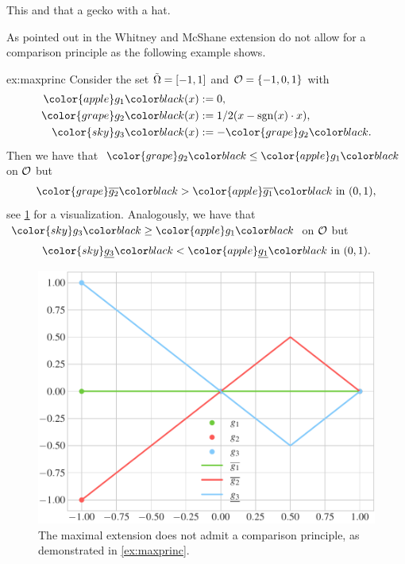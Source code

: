 \begin{example}{}{}
This and that a gecko with a hat.
\end{example}
%
As pointed out in \cite{aronsson2004tour} the Whitney and McShane extension do not allow for a comparison principle as the following example 
shows.
%
\begin{example}{}{ex:maxprinc}
Consider the set $\tilde{\Omega} = [-1,1]$ and $\mathcal{O}=\{-1,0,1\}$ with 
%
\begin{align*}
\color{apple}g_1\bc(x)&:= 0,\\
\color{grape}g_2\bc(x)&:= 1/2 (x- \sign(x)\cdot x),\\
\color{sky}g_3\bc(x)&:= -\color{grape}g_2\bc.
\end{align*}
%
Then we have that $\color{grape}g_2\bc\leq \color{apple}g_1\bc$ on $\mathcal{O}$ but 
%
\begin{align*}
\color{grape}\Whit{g_2}\bc>\color{apple} \Whit{g_1}\bc \text{ in } (0,1),
\end{align*}
%
see \cref{fig:maxprinc} for a visualization. Analogously, we have that $\color{sky}g_3\bc\geq \color{apple}g_1\bc$ on $\mathcal{O}$ but 
%
\begin{align*}
\color{sky}\McS{g_3}\bc<\color{apple} \McS{g_1}\bc \text{ in } (0,1).
\end{align*}
\end{example}
%
\begin{figure}
\centering
\includegraphics[width=.5\textwidth]{code/lipextcomp/comp.pdf}
\caption{The maximal extension does not admit a comparison principle, as demonstrated in \cref{ex:maxprinc}.}\label{fig:maxprinc}
\end{figure}


